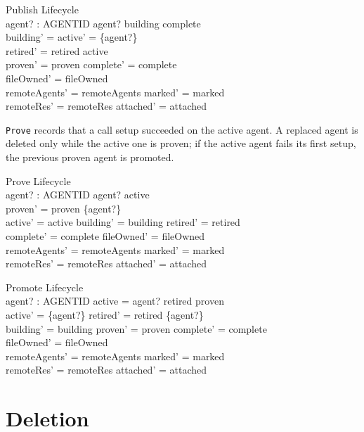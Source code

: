 \documentclass[a4paper,10pt,fleqn]{article}
\begin{document}
\begin{schema}{Publish}
  \Delta Lifecycle \\
  agent? : AGENTID
\where
  agent? \in building \cap complete \\
  building' = \emptyset \land active' = \{agent?\} \\
  retired' = retired \cup active \\
  proven' = proven \land complete' = complete \\
  fileOwned' = fileOwned \\
  remoteAgents' = remoteAgents \land marked' = marked \\
  remoteRes' = remoteRes \land attached' = attached
\end{schema}

\texttt{Prove} records that a call setup succeeded on the active agent. A
replaced agent is deleted only while the active one is proven; if the
active agent fails its first setup, the previous proven agent is promoted.

\begin{schema}{Prove}
  \Delta Lifecycle \\
  agent? : AGENTID
\where
  agent? \in active \\
  proven' = proven \cup \{agent?\} \\
  active' = active \land building' = building \land retired' = retired \\
  complete' = complete \land fileOwned' = fileOwned \\
  remoteAgents' = remoteAgents \land marked' = marked \\
  remoteRes' = remoteRes \land attached' = attached
\end{schema}

\begin{schema}{Promote}
  \Delta Lifecycle \\
  agent? : AGENTID
\where
  active = \emptyset \land agent? \in retired \cap proven \\
  active' = \{agent?\} \land retired' = retired \setminus \{agent?\} \\
  building' = building \land proven' = proven \land complete' = complete \\
  fileOwned' = fileOwned \\
  remoteAgents' = remoteAgents \land marked' = marked \\
  remoteRes' = remoteRes \land attached' = attached
\end{schema}

\section{Deletion}
\end{document}

